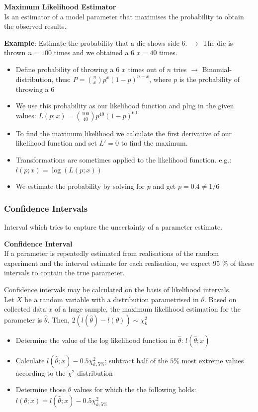 \documentclass{article}
\begin{document}
\begin{multicols*}{3}
\begin{mdframed}[backgroundcolor=astral] 
    \textbf{Maximum Likelihood Estimator}\\
    Is an estimator of a model parameter that maximises the probability to obtain the observed results.
\end{mdframed}

\textbf{Example}: Estimate the probability that a die shows side 6. $\rightarrow$ The die is thrown $n = 100$ times and we obtained a 6 $x = 40$ times. 
\begin{itemize}
    \item Define probability of throwing a 6 $x$ times out of $n$ tries $\rightarrow$ Binomial-distribution, thus: $P = {n\choose x}p^x(1-p)^{n-x}$, where $p$ is the probability of throwing a 6
    \item We use this probability as our likelihood function and plug in the given values: $L(p;x) = {100\choose 40}p^{40}(1-p)^{60}$
    \item To find the maximum likelihood we calculate the first derivative of our likelihood function and set $L' = 0$ to find the maximum. 
    \item Transformations are sometimes applied to the likelihood function. e.g.: $l(p;x) = \log (L(p;x))$
    \item We estimate the probability by solving for $p$ and get $p = 0.4 \neq 1/6$
\end{itemize}

\subsubsection{Confidence Intervals}

Interval which tries to capture the uncertainty of a parameter estimate. 

\begin{mdframed}[backgroundcolor=astral] 
    \textbf{Confidence Interval}\\
    If a parameter is repeatedly estimated from realisations of the random experiment and the interval estimate for each realisation, we expect 95 \% of these intervals to contain the true parameter.
\end{mdframed}

Confidence intervals may be calculated on the basis of likelihood intervals.\\
Let $X$ be a random variable with a distribution parametrised in $\theta$. Based on collected data $x$ of a huge sample, the maximum likelihood estimation for the parameter is $\hat{\theta}$. Then, $2(l(\hat{\theta}) - l(\theta)) \sim \chi^2_k$
\begin{itemize}
    \item Determine the value of the log likelihood function in $\hat{\theta}$: $l(\hat{\theta};x)$
    \item Calculate $l(\hat{\theta};x) - 0.5\chi^2_{k,5\%}$; subtract half of the $5\%$ most extreme values according to the $\chi^2$-distribution
    \item Determine those $\theta$ values for which the the following holds: 
    $l(\theta;x) = l(\hat{\theta};x) - 0.5\chi^2_{k,5\%}$
\end{itemize}


\end{multicols*}
\end{document}
